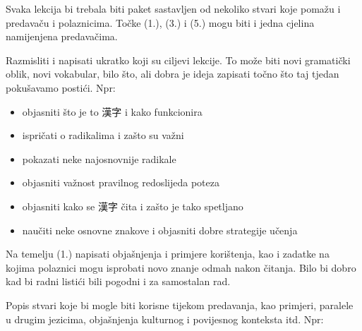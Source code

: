 
\author{Tomislav Mamić}


	
	Svaka lekcija bi trebala biti paket sastavljen od nekoliko stvari koje pomažu i predavaču i polaznicima. Točke (1.), (3.) i (5.) mogu biti i jedna cjelina namijenjena predavačima.
	
	
	Razmisliti i napisati ukratko koji su ciljevi lekcije. To može biti novi gramatički oblik, novi vokabular, bilo što, ali dobra je ideja zapisati točno što taj tjedan pokušavamo postići. Npr:
	
	\begin{itemize}
		\itemsep-5pt
		\item objasniti što je to 漢字 i kako funkcionira
		\item ispričati o radikalima i zašto su važni
		\item pokazati neke najosnovnije radikale
		\item objasniti važnost pravilnog redoslijeda poteza
		\item objasniti kako se 漢字 čita i zašto je tako spetljano
		\item naučiti neke osnovne znakove i objasniti dobre strategije učenja
	\end{itemize}

	
	Na temelju (1.) napisati objašnjenja i primjere korištenja, kao i zadatke na kojima polaznici mogu isprobati novo znanje odmah nakon čitanja. Bilo bi dobro kad bi radni listići bili pogodni i za samostalan rad.
	
	
	Popis stvari koje bi mogle biti korisne tijekom predavanja, kao primjeri, paralele u drugim jezicima, objašnjenja kulturnog i povijesnog konteksta itd. Npr:
	
